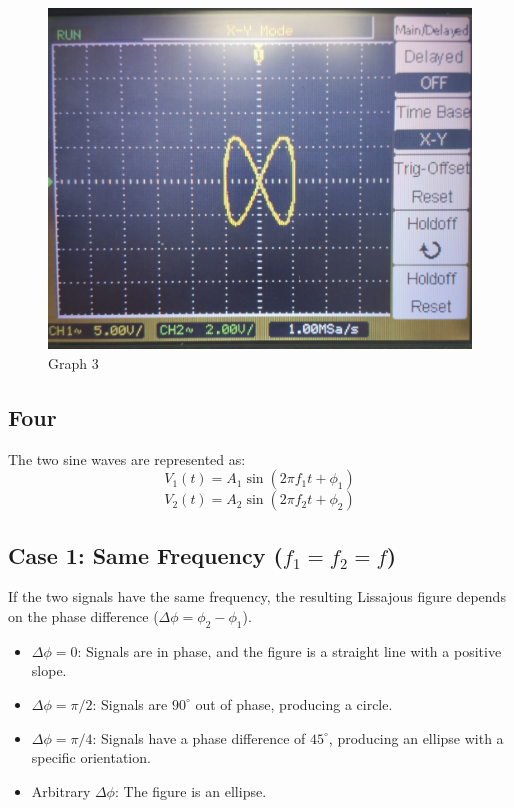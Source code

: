 \documentclass[12pt,a4paper]{report}
\begin{document}
\begin{figure}[H]
\begin{minipage}[c]{0.48\textwidth}
    \end{minipage}
    \hfill
    \begin{minipage}[c]{0.48\textwidth}
        \includegraphics[width=\textwidth]{figs/3cro.jpg} %
        
    \end{minipage}
    \caption{Graph 3}
    \label{fig:CRO-patterns}
\end{figure}
\subsection{Four}
The two sine waves are represented as:
\[
V_1(t) = A_1 \sin(2 \pi f_1 t + \phi_1)
\]
\[
V_2(t) = A_2 \sin(2 \pi f_2 t + \phi_2)
\]

\subsection*{Case 1: Same Frequency (\(f_1 = f_2 = f\))}
If the two signals have the same frequency, the resulting Lissajous figure depends on the phase difference (\( \Delta \phi = \phi_2 - \phi_1 \)).

\begin{itemize}
    \item \(\Delta \phi = 0\): Signals are in phase, and the figure is a straight line with a positive slope.
    \item \(\Delta \phi = \pi/2\): Signals are \(90^\circ\) out of phase, producing a circle.
    \item \(\Delta \phi = \pi/4\): Signals have a phase difference of \(45^\circ\), producing an ellipse with a specific orientation.
    \item Arbitrary \(\Delta \phi\): The figure is an ellipse.
\end{itemize}
\end{document}
